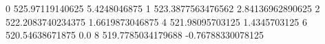 0 525.97119140625 5.4248046875
1 523.3877563476562 2.84136962890625
2 522.2083740234375 1.6619873046875
4 521.98095703125 1.4345703125
6 520.54638671875 0.0
8 519.7785034179688 -0.76788330078125
